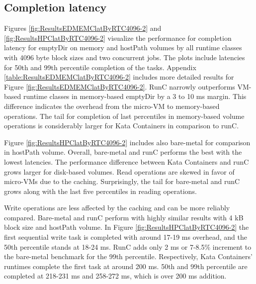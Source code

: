 \subsection{Completion latency}

Figures \ref{fig:ResultsEDMEMClatByRTC4096-2} and \ref{fig:ResultsHPClatByRTC4096-2} visualize the performance for completion latency for emptyDir on memory and hostPath volumes by all runtime classes with 4096 byte block sizes and two concurrent jobs. The plots include latencies for 50th and 99th percentile completion of the tasks. Appendix \ref{table:ResultsEDMEMClatByRTC4096-2} includes more detailed results for Figure \ref{fig:ResultsEDMEMClatByRTC4096-2}. RunC narrowly outperforms VM-based runtime classes in memory-based emptyDir by a 3 to 10 ms margin. This difference indicates the overhead from the micro-VM to memory-based operations. The tail for completion of last percentiles in memory-based volume operations is considerably larger for Kata Containers in comparison to runC.

Figure \ref{fig:ResultsHPClatByRTC4096-2} includes also bare-metal for comparison in hostPath volume. Overall, bare-metal and runC performs the best with the lowest latencies. The performance difference between Kata Containers and runC grows larger for disk-based volumes. Read operations are skewed in favor of micro-VMs due to the caching. Surprisingly, the tail for bare-metal and runC grows along with the last five percentiles in reading operations.

Write operations are less affected by the caching and can be more reliably compared. Bare-metal and runC perform with highly similar results with 4 kB block size and hostPath volume. In Figure \ref{fig:ResultsHPClatByRTC4096-2} the first sequential write task is completed with around 17-19 ms overhead, and the 50th percentile stands at 18-24 ms. RunC adds only 2 ms or 7-8.5\% increment to the bare-metal benchmark for the 99th percentile. Respectively, Kata Containers' runtimes complete the first task at around 200 ms. 50th and 99th percentile are completed at 218-231 ms and 258-272 ms, which is over 200 ms addition.

